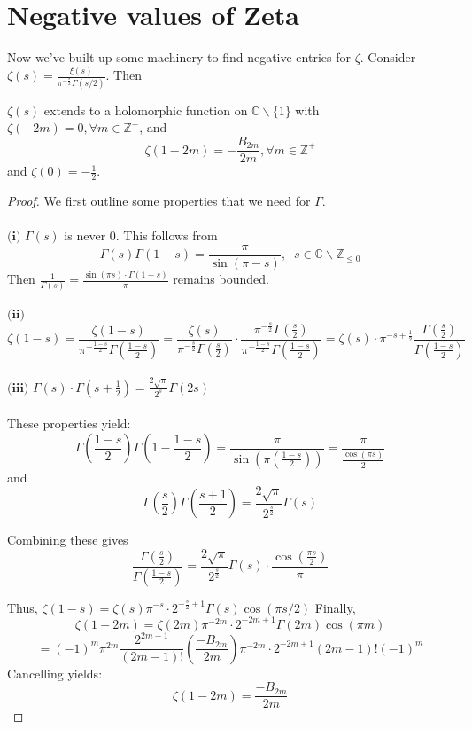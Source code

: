 \section{Negative values of Zeta}
Now we've built up some machinery to find negative entries for $\zeta$. Consider
$\zeta(s) = \frac{\xi(s)}{\pi^{-\frac{s}{2}}\Gamma(s/2)}$. Then
\begin{theorem}
    $\zeta(s)$ extends to a holomorphic function on 
    $\mathbb{C}\backslash\{1\}$ with $\zeta(-2m)=0, \forall m \in\mathbb{Z}^+$, and 
    \[\zeta(1-2m)=-\frac{B_{2m}}{2m}, \forall m\in\mathbb{Z}^+\] and $\zeta(0)=-\frac{1}{2}$.
\end{theorem}
\begin{proof}
    We first outline some properties that we need for $\Gamma$.\\\\
    $\textbf{(i)}$ $\Gamma(s)$ is never 0. This follows from 
    \[\Gamma(s)\Gamma(1-s)=\frac{\pi}{\sin(\pi-s)}, \;\; s\in\mathbb{C}\backslash\mathbb{Z}_{\leq 0}\]
    Then $\frac{1}{\Gamma(s)}=\frac{\sin(\pi s)\cdot \Gamma(1-s)}{\pi}$ remains bounded.\\\\
    $\textbf{(ii)}$ 
    \[
        \zeta(1-s)=\frac{\zeta(1-s)}{\pi^{-\frac{1-s}{2}}\Gamma(\frac{1-s}{2})}
        =\frac{\zeta(s)}{\pi^{-\frac{s}{2}}\Gamma(\frac{s}{2})}\cdot\frac{\pi^{-\frac{s}{2}}
        \Gamma(\frac{s}{2})}{\pi^{-\frac{1-s}{2}}\Gamma(\frac{1-s}{2})}
        =\zeta(s)\cdot{\pi^{-s+\frac{1}{2}}}\frac{\Gamma(\frac{s}{2})}{\Gamma(\frac{1-s}{2})}
    \]\\
    $\textbf{(iii)}$ $\Gamma(s)\cdot\Gamma(s+\frac{1}{2})=\frac{2\sqrt{\pi}}{2^s}\Gamma(2s)$ \\\\
    These properties yield:
    \begin{equation}
        \Gamma(\frac{1-s}{2})\Gamma(1-\frac{1-s}{2})=\frac{\pi}{\sin(\pi(\frac{1-s}{2}))}=
        \frac{\pi}{\frac{\cos(\pi s)}{2}}  
    \end{equation}
    and 
    \begin{equation}
        \Gamma(\frac{s}{2})\Gamma(\frac{s+1}{2})=\frac{2\sqrt{\pi}}{2^{\frac{s}{2}}}\Gamma(s)
    \end{equation}

    Combining these gives 
    \[
        \frac{\Gamma(\frac{s}{2})}{\Gamma(\frac{1-s}{2})}=\frac{2\sqrt{\pi}}{2^{\frac{s}{2}}}
        \Gamma(s) \cdot\frac{\cos(\frac{\pi s}{2})}{\pi}  
    \]
    
    Thus, $\zeta(1-s)=\zeta(s)\pi^{-s}\cdot 2^{-\frac{s}{2}+1}\Gamma(s)\cos(\pi s/2)$
    Finally, 
    \[
        \zeta(1-2m)=\zeta(2m)\pi^{-2m}\cdot 2^{-2m+1}\Gamma(2m)\cos(\pi m)\]\[
        =(-1)^m\pi^{2m}\frac{2^{2m-1}}{(2m-1)!}(\frac{-B_{2m}}{2m})\pi^{-2m}\cdot2^{-2m+1}(2m-1)!(-1)^m
    \]
    Cancelling yields: 
    \[
        \zeta(1-2m)=\frac{-B_{2m}}{2m}
    \]  
\end{proof}
